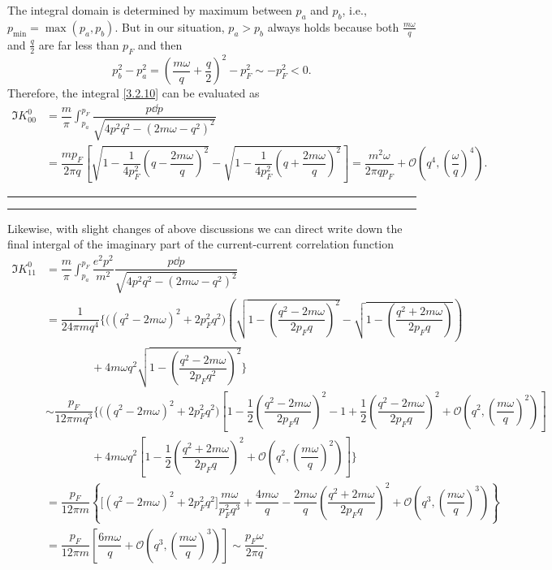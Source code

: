 \documentclass[bachelor,english,numbers]{ustcthesis}
\begin{document}
\begin{itemize}
\begin{equation*}
				\end{equation*}
				The integral domain is determined by maximum between $p_a$ and $p_b$, i.e., $p_{\text{min}}=\max(p_a,p_b)$. But in our situation, $p_a>p_b$ always holds because both $\frac{m\omega}{q}$ and $\frac{q}{2}$ are far less than $p_F$ and then
				\begin{equation*}
					p_b^2-p_a^2=\left(\dfrac{m\omega}{q}+\dfrac{q}{2}\right)^2-p_F^2\sim -p_F^2<0.
				\end{equation*}
				Therefore, the integral \eqref{3.2.10} can be evaluated as
				\begin{align}
					\Im K^0_{00}&=\dfrac{m}{\pi}\int_{p_a}^{p_F}\dfrac{p\dd p}{\sqrt{4p^2q^2-(2m\omega-q^2)^2}}\nonumber\\
					&=\dfrac{mp_F}{2\pi q}\left[\sqrt{1-\dfrac{1}{4p_F^2}\left(q-\dfrac{2m\omega}{q}\right)^2}-\sqrt{1-\dfrac{1}{4p_F^2}\left(q+\dfrac{2m\omega}{q}\right)^2}\right]=\dfrac{m^2\omega}{2\pi q p_F}+\mathcal{O}\left(q^4,\left(\dfrac{\omega}{q}\right)^4\right).\label{3.2.11}
				\end{align}
				\vspace{1em}
				\hrule
				\vspace{2pt}
				\hrule
				\vspace{1em}
				Likewise, with slight changes of above discussions we can direct write down the final intergal of the imaginary part of the current-current correlation function
				\begin{align}
					\Im K^0_{11}&=\dfrac{m}{\pi}\int_{p_a}^{p_F}\dfrac{e^2p^2}{m^2}\dfrac{p\dd p}{\sqrt{4p^2q^2-(2m\omega-q^2)^2}}\nonumber\\
					&=\dfrac{1}{24\pi mq^4}\Bigg\{\bigg((q^2-2m\omega)^2+2p_F^2q^2\bigg)\left(\sqrt{1-\left(\dfrac{q^2-2m\omega}{2p_Fq}\right)^2}-\sqrt{1-\left(\dfrac{q^2+2m\omega}{2p_Fq}\right)}\right)\nonumber\\
					&\qquad\qquad+4m\omega q^2\sqrt{1-\left(\dfrac{q^2-2m\omega}{2p_Fq^2}\right)^2}\Bigg\}\nonumber\\
					&\sim\dfrac{p_F}{12\pi mq^3}\Bigg\{\bigg((q^2-2m\omega)^2+2p_F^2q^2\bigg)\left[1-\dfrac{1}{2}\left(\dfrac{q^2-2m\omega}{2p_Fq}\right)^2-1+\dfrac{1}{2}\left(\dfrac{q^2-2m\omega}{2p_Fq}\right)^2+\mathcal{O}\left(q^2,\left(\dfrac{m\omega}{q}\right)^2\right)\right]\nonumber\\
					&\qquad\qquad +4m\omega q^2\left[1-\dfrac{1}{2}\left(\dfrac{q^2+2m\omega}{2p_Fq}\right)^2+\mathcal{O}\left(q^2,\left(\dfrac{m\omega}{q}\right)^2\right)\right]\Bigg\}\nonumber\\
					&=\dfrac{p_F}{12\pi m}\left\{\bigg[(q^2-2m\omega)^2+2p_F^2q^2\bigg]\dfrac{m\omega}{p_F^2q^3}+\dfrac{4m\omega}{q}-\dfrac{2m\omega}{q}\left(\dfrac{q^2+2m\omega}{2p_Fq}\right)^2+\mathcal{O}\left(q^3,\left(\dfrac{m\omega}{q}\right)^3\right)\right\}\nonumber\\
					&=\dfrac{p_F}{12\pi m}\left[\dfrac{6m\omega}{q}+\mathcal{O}\left(q^3,\left(\dfrac{m\omega}{q}\right)^3\right)\right]\sim\dfrac{p_F \omega}{2\pi q}.\label{3.2.12}
				\end{align}
		\end{itemize}
		
\end{document}
